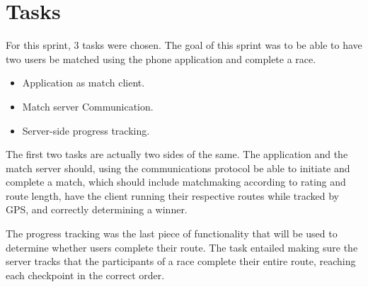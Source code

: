 \section{Tasks}
\label{sec:sprint4-tasks}

For this sprint, 3 tasks were chosen. The goal of this sprint was to be able to have two users be matched using the phone application and complete a race.

\begin{itemize}
	\item{Application as match client.}
	\item{Match server Communication.}
	\item{Server-side progress tracking.}
\end{itemize}

The first two tasks are actually two sides of the same. The application and the match server should, using the communications protocol be able to initiate and complete a match, which should include matchmaking according to rating and route length, have the client running their respective routes while tracked by \ac{GPS}, and correctly determining a winner.

The progress tracking was the last piece of functionality that will be used to determine whether users complete their route. The task entailed making sure the server tracks that the participants of a race complete their entire route, reaching each checkpoint in the correct order.
